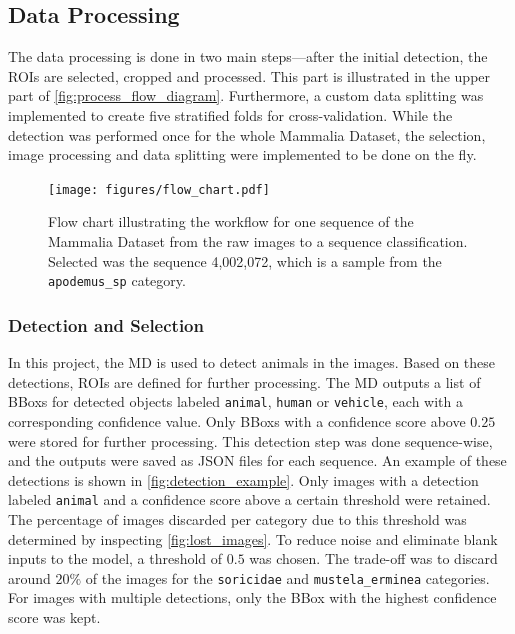     \subsection{Data Processing}
    \label{data_processing}

    The data processing is done in two main steps---after the initial detection, the \acp{ROI} are selected, cropped and processed.
    This part is illustrated in the upper part of \autoref{fig:process_flow_diagram}.
    Furthermore, a custom data splitting was implemented to create five stratified folds for cross-validation.
    While the detection was performed once for the whole Mammalia Dataset, the selection, image processing and data splitting were implemented to be done on the fly.

    \begin{figure}[p]
    \centering
    \texttt{[image: figures/flow\_chart.pdf]}
    \caption{
        Flow chart illustrating the workflow for one sequence of the Mammalia Dataset from the raw images to a sequence classification. 
        Selected was the sequence 4,002,072, which is a sample from the \texttt{apodemus\_sp} category.
        }
    \label{fig:process_flow_diagram}
    \end{figure}

        \subsubsection{Detection and Selection}
        In this project, the \ac{MD} \autocite{beeryEfficientPipelineCamera2019} is used to detect animals in the images.
        Based on these detections, \acsp{ROI} are defined for further processing.
        The \ac{MD} outputs a list of \acp{BBox} for detected objects labeled \texttt{animal}, \texttt{human} or \texttt{vehicle}, each with a corresponding confidence value.
        Only \acp{BBox} with a confidence score above \(0.25\) were stored for further processing.
        This detection step was done sequence-wise, and the outputs were saved as JSON files for each sequence.
        An example of these detections is shown in \autoref{fig:detection_example}.
        Only images with a detection labeled \texttt{animal} and a confidence score above a certain threshold were retained.
        The percentage of images discarded per category due to this threshold was determined by inspecting \autoref{fig:lost_images}.
        To reduce noise and eliminate blank inputs to the model, a threshold of \(0.5\) was chosen.
        The trade-off was to discard around \(20\%\) of the images for the \texttt{soricidae} and \texttt{mustela\_erminea} categories.
        For images with multiple detections, only the \ac{BBox} with the highest confidence score was kept.

